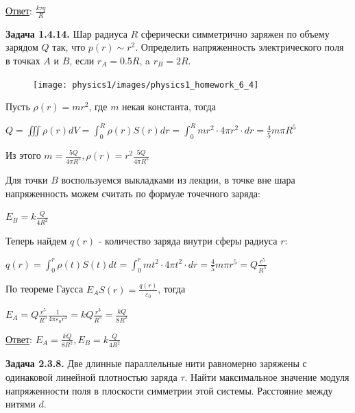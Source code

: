 \documentclass[12pt]{article}
\begin{document}
\underline{Ответ}: $\frac{k\tau q}{R}$

\clearpage

\begin{tcolorbox}
    \textbf{Задача 1.4.14.} Шар радиуса $R$ сферически симметрично
    заряжен по объему зарядом $Q$ так, что $p(r) \sim r^2$. Определить
    напряженность электрического поля в точках $A$ и $B$, если $r_A = 0.5R$,
    a $r_B=2R$.
\end{tcolorbox}


\begin{minipage}{\textwidth}
    \begin{figure}
        \texttt{[image: physics1/images/physics1\_homework\_6\_4]}
    \end{figure}

    Пусть $\rho(r) = mr^2$, где $m$ некая константа, тогда 

    $Q = \iiint \rho(r) dV = \int_0^R \rho(r) S(r) dr = \int_0^R mr^2 \cdot 4\pi r^2 \cdot dr = \frac{4}{5}m\pi R^5$

    Из этого $m = \frac{5Q}{4\pi R^5}, \rho(r) = r^2\frac{5Q}{4\pi R^5}$

    Для точки $B$ воспользуемся выкладками из лекции, в точке вне шара напряженность можем считать по формуле
    точечного заряда:

    $E_B = k\frac{Q}{4R^2}$

    Теперь найдем $q(r)$ - количество заряда внутри сферы радиуса $r$:

    $q(r) = \int_0^r \rho(t) S(t) dt = \int_0^r mt^2 \cdot 4\pi t^2 \cdot dr = \frac{4}{5}m\pi r^5 = Q\frac{r^5}{R^5}$

    По теореме Гаусса $E_A S(r) = \frac{q(r)}{\varepsilon_0}$, тогда 

    $E_A = Q\frac{r^5}{R^5} \frac{1}{4\pi\varepsilon_0 r^2} = kQ\frac{r^3}{R^5} = \frac{kQ}{8R^2}$

\end{minipage}

\underline{Ответ}: $E_A = \frac{kQ}{8R^2}, E_B = k\frac{Q}{4R^2}$


\clearpage







\clearpage

\begin{tcolorbox}
    \textbf{Задача 2.3.8.} Две длинные параллельные нити равномерно
    заряжены с одинаковой линейной плотностью заряда $\tau$. Найти
    максимальное значение модуля напряженности поля в плоскости
    симметрии этой системы. Расстояние между нитями $d$.
\end{tcolorbox}
\end{document}
